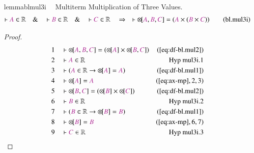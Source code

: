 \begin{restatable}{lemma}{blmul3i}~~ Multiterm Multiplication of Three Values.
\begin{align}
\vdash \mc{A} \in \mathbb{R}\quad\&\quad \vdash \mc{B} \in
    \mathbb{R}\quad\&\quad \vdash \mc{C} \in \mathbb{R}\quad\Rightarrow\quad
    \vdash {\otimes\hspace{-1pt}[} \mc{A} , \mc{B} , \mc{C} ] = ( \mc{A} \times
    ( \mc{B} \times \mc{C} ) )\label{eq:bl.mul3i}\tag{bl.mul3i}
\end{align}
\end{restatable}

\begin{proof}
\begin{align}
  1 &&  & \vdash {\otimes\hspace{-1pt}[} \mc{A} , \mc{B} , \mc{C} ] = (
      {\otimes\hspace{-1pt}[} \mc{A} ] \times
      {\otimes\hspace{-1pt}[} \mc{B} , \mc{C} ]
      )&(\mbox{\ref{eq:df-bl.mul2}})\notag
  \\ 2 &&  & \vdash \mc{A} \in \mathbb{R}&\text{Hyp~mul3i.1}\notag%
  \\ 3 &&  & \vdash ( \mc{A} \in \mathbb{R} \rightarrow {\otimes\hspace{-1pt}[}
      \mc{A} ] = \mc{A}
      )&(\mbox{\ref{eq:df-bl.mul1}})\notag
  \\ 4 &&  & \vdash {\otimes\hspace{-1pt}[} \mc{A} ] =
      \mc{A}&(\mbox{\ref{eq:ax-mp}},2,3)\notag
  \\ 5 &&  & \vdash {\otimes\hspace{-1pt}[} \mc{B} , \mc{C} ] = (
      {\otimes\hspace{-1pt}[} \mc{B} ] \times
      {\otimes\hspace{-1pt}[} \mc{C} ]
      )&(\mbox{\ref{eq:df-bl.mul2}})\notag
  \\ 6 &&  & \vdash \mc{B} \in \mathbb{R}&\text{Hyp~mul3i.2}\notag%
  \\ 7 &&  & \vdash ( \mc{B} \in \mathbb{R} \rightarrow {\otimes\hspace{-1pt}[}
      \mc{B} ] = \mc{B}
      )&(\mbox{\ref{eq:df-bl.mul1}})\notag
  \\ 8 &&  & \vdash {\otimes\hspace{-1pt}[} \mc{B} ] =
      \mc{B}&(\mbox{\ref{eq:ax-mp}},6,7)\notag
  \\ 9 &&  & \vdash \mc{C} \in \mathbb{R}&\text{Hyp~mul3i.3}\notag%

\end{align}
\end{proof}
